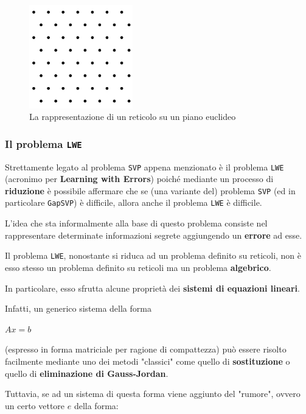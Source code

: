 \documentclass[a4paper, 12pt, oneside]{article}
\theoremstyle{definition}
\begin{document}
\begin{figure}[H]
    \centering
    \includegraphics[width=0.4\textwidth]{images/Equilateral_Triangle_Lattice.svg.png}
    \caption{La rappresentazione di un reticolo su un piano euclideo}
\end{figure}

\newpage
\subsubsection{Il problema \texttt{LWE}}
Strettamente legato al problema \texttt{SVP} appena menzionato è il problema \texttt{LWE} (acronimo per \textbf{Learning with Errors}) poiché mediante un processo di \textbf{riduzione} \cite{10.1145/1060590.1060603} è possibile affermare che se (una variante del) problema \texttt{SVP} (ed in particolare \texttt{GapSVP}) è difficile, allora anche il problema \texttt{LWE} è difficile.

L'idea che sta informalmente alla base di questo problema consiste nel rappresentare determinate informazioni segrete aggiungendo un \textbf{errore} ad esse. 

Il problema \texttt{LWE}, nonostante si riduca ad un problema definito su reticoli, non è esso stesso un problema definito su reticoli ma un problema \textbf{algebrico}. 

In particolare, esso sfrutta alcune proprietà dei \textbf{sistemi di equazioni lineari}.

Infatti, un generico sistema della forma

\begin{center}
    $Ax = b$
\end{center}

(espresso in forma matriciale per ragione di compattezza) può essere risolto facilmente mediante uno dei metodi "classici" come quello di \textbf{sostituzione} o quello di \textbf{eliminazione di Gauss-Jordan}.

Tuttavia, se ad un sistema di questa forma viene aggiunto del "rumore", ovvero un certo vettore $e$ della forma:
\end{document}
